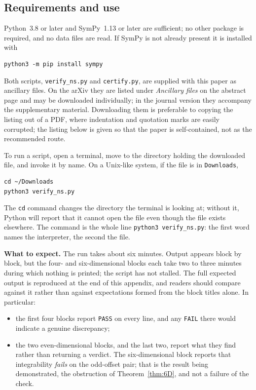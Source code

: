 \documentclass[11pt]{jfm}
\numberwithin{equation}{section}
\begin{document}
\subsection*{Requirements and use}
Python~3.8 or later and SymPy~1.13 or later are sufficient; no other package is required, and no
data files are read. If SymPy is not already present it is installed with
\begingroup\small
\begin{verbatim}
python3 -m pip install sympy
\end{verbatim}
\endgroup

\noindent Both scripts, \texttt{verify\_ns.py} and \texttt{certify.py}, are supplied with this
paper as ancillary files. On the arXiv they are listed under \emph{Ancillary files} on the abstract
page and may be downloaded individually; in the journal version they accompany the supplementary
material. Downloading them is preferable to copying the listing out of a PDF, where indentation and
quotation marks are easily corrupted; the listing below is given so that the paper is
self-contained, not as the recommended route.

To run a script, open a terminal, move to the directory holding the downloaded file, and invoke it
by name. On a Unix-like system, if the file is in \texttt{Downloads},
\begingroup\small
\begin{verbatim}
cd ~/Downloads
python3 verify_ns.py
\end{verbatim}
\endgroup

\noindent The \texttt{cd} command changes the directory the terminal is looking at; without it,
Python will report that it cannot open the file even though the file exists elsewhere. The command
is the whole line \texttt{python3 verify\_ns.py}: the first word names the interpreter, the second
the file.

\medskip
\noindent\textbf{What to expect.} The run takes about six minutes. Output appears block by block,
but the four- and six-dimensional blocks each take two to three minutes during which nothing is
printed; the script has not stalled. The full expected output is reproduced at the end of this
appendix, and readers should compare against it rather than against expectations formed from the
block titles alone. In particular:
\begin{itemize}
\item the first four blocks report \texttt{PASS} on every line, and any \texttt{FAIL} there would
indicate a genuine discrepancy;
\item the two even-dimensional blocks, and the last two, report what they find rather than
returning a verdict. The six-dimensional block reports that integrability \emph{fails} on the
odd-offset pair; that is the result being demonstrated, the obstruction of
Theorem~\ref{thm:6D}, and not a failure of the check.
\end{itemize}
\end{document}
